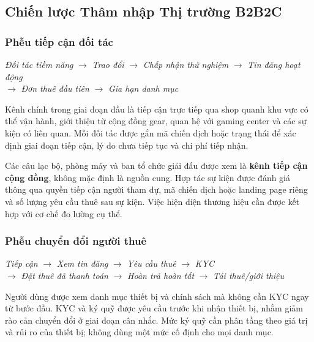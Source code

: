 \subsection{Chiến lược Thâm nhập Thị trường B2B2C}

\subsubsection{Phễu tiếp cận đối tác}

\begin{center}
\small
\textit{Đối tác tiềm năng} $\rightarrow$ \textit{Trao đổi} $\rightarrow$ \textit{Chấp nhận thử nghiệm} $\rightarrow$ \textit{Tin đăng hoạt động} \\
$\rightarrow$ \textit{Đơn thuê đầu tiên} $\rightarrow$ \textit{Gia hạn danh mục}
\end{center}

Kênh chính trong giai đoạn đầu là tiếp cận trực tiếp qua shop quanh khu vực có thể vận hành, giới thiệu từ cộng đồng gear, quan hệ với gaming center và các sự kiện có liên quan. Mỗi đối tác được gắn mã chiến dịch hoặc trạng thái để xác định giai đoạn tiếp cận, lý do chưa tiếp tục và chi phí tiếp nhận.

Các câu lạc bộ, phòng máy và ban tổ chức giải đấu được xem là \textbf{kênh tiếp cận cộng đồng}, không mặc định là nguồn cung. Hợp tác sự kiện được đánh giá thông qua quyền tiếp cận người tham dự, mã chiến dịch hoặc landing page riêng và số lượng yêu cầu thuê sau sự kiện. Việc hiện diện thương hiệu cần được kết hợp với cơ chế đo lường cụ thể.

\subsubsection{Phễu chuyển đổi người thuê}

\begin{center}
\small
\textit{Tiếp cận} $\rightarrow$ \textit{Xem tin đăng} $\rightarrow$ \textit{Yêu cầu thuê} $\rightarrow$ \textit{KYC} \\
$\rightarrow$ \textit{Đặt thuê đã thanh toán} $\rightarrow$ \textit{Hoàn trả hoàn tất} $\rightarrow$ \textit{Tái thuê/giới thiệu}
\end{center}

Người dùng được xem danh mục thiết bị và chính sách mà không cần KYC ngay từ bước đầu. KYC và ký quỹ được yêu cầu trước khi nhận thiết bị, nhằm giảm rào cản chuyển đổi ở giai đoạn cân nhắc. Mức ký quỹ cần phân tầng theo giá trị và rủi ro của thiết bị; không dùng một mức cố định cho mọi danh mục.

